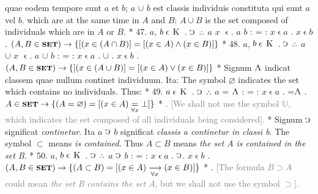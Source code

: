\documentclass{book}
\newcommand{\C}{\mathop{\sbox0{$\displaystyle$$\reflectbox{C}$} %
\raisebox{-\height+\ht0-0.05cm}[\ht0][\dp0]{\scalebox{0.8}[0.8]{\copy0}}}\displaylimits} %
\newcommand{\pppNoSpace}{\leavevmode\lower0ex\hbox{.}\kern-0.1em\raise0.7ex\hbox{.}\kern-0.1em\lower0ex\hbox{.}} %
\newcommand{\abs}{\mathop{\rotatebox[origin=c]{180}{V}}}
\newcommand{\smallIn}{\ensuremath{\mathrel{\epsilon}}}
\newcommand{\K}{\mathop{\thinspace \text{K} \thinspace}}
\newcommand{\setOfSets}{\mathord{\text{{\footnotesize \textbf{SET}}}}}
\newcommand\irrelavent[1]{\textcolor{gray}{#1}}
\newenvironment{translateTwoCol}
               { %
                 \columnratio{0.5, 0.5} \begin{paracol}{2}
                 \newcommand{\LAT}{\switchcolumn[0]*}
                 \newcommand{\ENG}{\switchcolumn[1]}
               }
               { %
                 \let\ENG\undefined
                 \let\LAT\undefined
                 \end{paracol}
               }
\begin{document}
\begin{translateTwoCol}
quae eodem tempore sunt $a$ et $b$; $a$ $\cup$ $b$ est classis individuis constituta qui sunt $a$ vel $b$.
\ENG
which are at the same time in $A$ and $B$; $A \cup B$ is the set composed of individuals which are in $A$ or $B$.
\LAT
47. \hspace{0.67cm} $a$, $b \smallIn \K$ . $\C$ $\pppNoSpace$ $a$ $x$ \smallIn . $a$ $b$ : = : $x \smallIn a$ . $x \smallIn b$
\ENG
47. \hspace{0.67cm} $(A, B \in \setOfSets) \rightarrow \{[(x \in (A \cap B)] = [(x \in A) \wedge (x \in B)]\}$
\LAT
48. \hspace{0.67cm} $a$, $b \smallIn \K$ . $\C$ $\pppNoSpace$ $a$ $\cup$ $x$ \smallIn . $a$ $\cup$ $b$ : = : $x \smallIn a$ . $\cup$ . $x \smallIn b$
\ENG
48. \hspace{0.67cm} $(A, B \in \setOfSets) \rightarrow \{[(x \in (A \cup B)] = [(x \in A) \vee (x \in B)]\}$
\LAT
\quad Signum $\abs$ indicat classem quae nullum continet individuum. Ita:
\ENG
\quad The symbol $\varnothing$ indicates the set which contains no individuals. Thus:
\LAT
49. \hspace{0.67cm} $a \smallIn \K$ . $\C$ $\pppNoSpace$ $a$ = $\abs$ : = : $x \smallIn a$ . =\scalebox{0.7}{$x$}\thinspace  $\abs$
\ENG
49. \hspace{0.67cm} $A \in \setOfSets \rightarrow \{(A= \varnothing) = [(x \in A) \underset{\forall x}= \bot]\}$ 
\LAT
{}.
\ENG
\quad \irrelavent{[We shall not use the symbol $\mathbb{U}$, which indicates the set composed of all individuals being considered].}
\LAT
\quad Signum $\C$ significat \emph{continetur}. Ita $a$ $\C$ $b$ significat \emph{classis a continetur in classi b}.
\ENG
\quad The symbol $\subset$ means \emph{is contained}. Thus $A \subset B$ means \emph{the set A is contained in the set B}.
\LAT
50. \hspace{0.67cm} $a$, $b \smallIn \K$ . $\C$ $\pppNoSpace$ $a$ $\C$ $b$ : = : $x \smallIn a$ . $\C$\scalebox{0.7}{$x$}\thinspace . $x \smallIn b$
\ENG
50. \hspace{0.67cm} $(A, B \in \setOfSets) \rightarrow \{(A \subset B)=[(x\in A) \xrightarrow[\forall x]{} (x \in B)]\}$
\LAT
{}.
\ENG
\quad \irrelavent{[The formula $B \supset A$ could mean \emph{the set B contains the set A}, but we shall not use the symbol $\supset$].}

\end{translateTwoCol}
\end{document}
